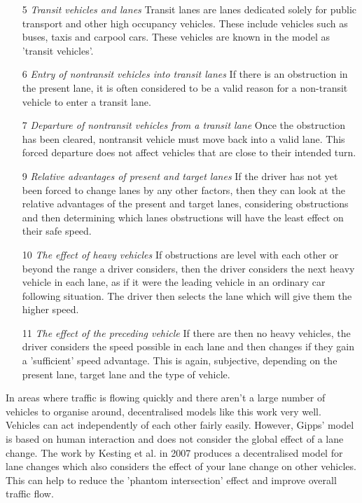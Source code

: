\begin{enumerate}
\item[5] \textit{Transit vehicles and lanes}
Transit lanes are lanes dedicated solely for public transport and other high occupancy vehicles. These include vehicles such as buses, taxis and carpool cars. These vehicles are known in the model as 'transit vehicles'.
\item[6] \textit{Entry of nontransit vehicles into transit lanes}
If there is an obstruction in the present lane, it is often considered to be a valid reason for a non-transit vehicle to enter a transit lane. 
\item[7] \textit{Departure of nontransit vehicles from a transit lane}
Once the obstruction has been cleared, nontransit vehicle must move back into a valid lane. This forced departure does not affect vehicles that are close to their intended turn.
\item[9] \textit{Relative advantages of present and target lanes}
If the driver has not yet been forced to change lanes by any other factors, then they can look at the relative advantages of the present and target lanes, considering obstructions and then determining which lanes obstructions will have the least effect on their safe speed.
\item[10] \textit{The effect of heavy vehicles} 
If obstructions are level with each other or beyond the range a driver considers, then the driver considers the next heavy vehicle in each lane, as if it were the leading vehicle in an ordinary car following situation. The driver then selects the lane which will give them the higher speed.
\item[11] \textit{The effect of the preceding vehicle}
If there are then no heavy vehicles, the driver considers the speed possible in each lane and then changes if they gain a 'sufficient' speed advantage. This is again, subjective, depending on the present lane, target lane and the type of vehicle.
\end{enumerate}

In areas where traffic is flowing quickly and there aren't a large number of vehicles to organise around, decentralised models like this work very well. Vehicles can act independently of each other fairly easily. However, Gipps' model is based on human interaction and does not consider the global effect of a lane change. The work by Kesting et al. in 2007 \citep{Kesting2007} produces a decentralised model for lane changes which also considers the effect of your lane change on other vehicles. This can help to reduce the 'phantom intersection' effect and improve overall traffic flow.

